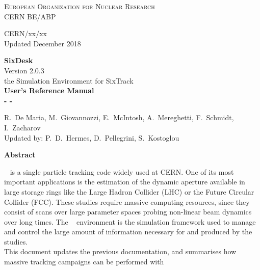 \begin{titlepage}
\begin{center}\normalsize\scshape
    European Organization for Nuclear Research \\
    CERN BE/ABP
\end{center}
\vspace*{2mm}
\begin{flushright}
    CERN/xx/xx \\
    Updated December 2018
\end{flushright}
\begin{center}\Huge
    \textbf{SixDesk} \\
    \LARGE Version 2.0.3 \\
    \vspace*{8mm} the Simulation Environment for SixTrack\\
    \vspace*{8mm}\textbf{User's Reference Manual}\\
    \vspace*{8mm}\textbf{- \whichSixTrack{} -}
\end{center}
\begin{center}
    \vspace*{2mm}
  R.~De Maria, M.~Giovannozzi, E.~McIntosh, A.~Mereghetti, F.~Schmidt,
  I.~Zacharov \\
    \vspace*{2mm}Updated by:
    P.~D.~Hermes, D.~Pellegrini, S.~Kostoglou
\end{center}
\begin{center}\large
    \vspace*{10mm}\textbf{Abstract} \\
\end{center}
\SIXTRACK{}~\cite{SixTrack_user_manual,SixPub,sixtrackWeb}
is a single particle tracking code widely used at CERN. One of its
most important applications is the estimation of the dynamic aperture available
in large storage rings like the Large Hadron Collider (LHC) or the Future
Circular Collider (FCC). These studies require massive computing resources,
since they consist of scans over large parameter spaces probing non-linear beam
dynamics over long times.
The \SIXDESK{}~\cite{SixDesk_original,SixDesk_updated} environment is the
simulation framework used to manage and control the large amount of
information necessary for and produced by the studies. \\
This document updates the previous documentation, and summarises how massive
tracking campaigns can be performed with \SIXTRACK{}

\end{titlepage}
